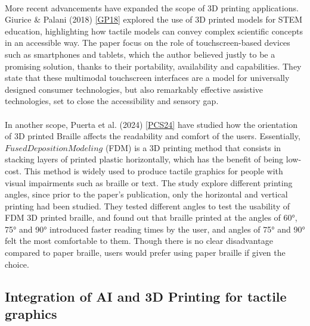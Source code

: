 \documentclass[12pt, letterpaper]{article}
\begin{document}
\begin{spacing}{1.15}
\paragraph{}
More recent advancements have expanded the scope of 3D printing applications. Giurice \& Palani (2018) \hyperlink{GP18target}{[GP18]} explored the use of 3D printed models for STEM education,
highlighting how tactile models can convey complex scientific concepts in an accessible way. The paper focus on the role of touchscreen-based devices such as smartphones and tablets, which the author
believed justly to be a promising solution, thanks to their portability, availability and capabilities. They state that these multimodal touchscreen interfaces are a model for 
universally designed consumer technologies, but also remarkably effective assistive technologies, set to close the accessibility and sensory gap.
\paragraph{}
In another scope, Puerta et al. (2024) \hyperlink{PCS24target}{[PCS24]} have studied how the orientation of 3D printed Braille affects the readability and comfort of the users. Essentially,
$Fused Deposition Modeling$ (FDM) is a 3D printing method that consists in stacking layers of printed plastic horizontally, which has the benefit of being low-cost. This method is widely used
to produce tactile graphics for people with visual impairments such as braille or text. The study explore different printing angles, since prior to the paper's publication, only the horizontal
and vertical printing had been studied. They tested different angles to test the usability of FDM 3D printed braille, and found out that braille printed at the angles of 60°, 75° and 90° introduced
faster reading times by the user, and angles of 75° and 90° felt the most comfortable to them. Though there is no clear disadvantage compared to paper braille, users would prefer using paper
braille if given the choice.



\subsection{Integration of AI and 3D Printing for tactile graphics}

\end{spacing}
\end{document}
